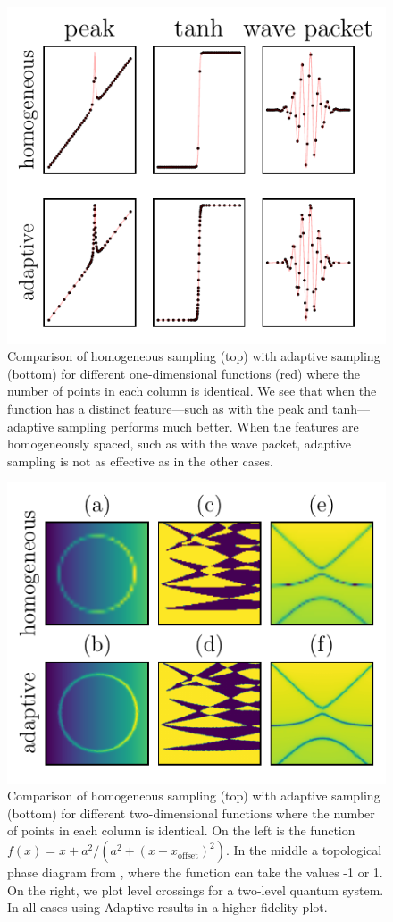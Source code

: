 \documentclass[english, twocolumn, 10pt, aps, superscriptaddress, floatfix, prb, citeautoscript]{revtex4-1}
\begin{document}
\begin{figure}
\centering
\includegraphics{figures/Learner1D.pdf}
\caption{Comparison of homogeneous sampling (top) with adaptive sampling (bottom) for different one-dimensional functions (red) where the number of points in each column is identical.
We see that when the function has a distinct feature---such as with the peak and tanh---adaptive sampling performs much better.
When the features are homogeneously spaced, such as with the wave packet, adaptive sampling is not as effective as in the other cases.\label{fig:Learner1D}}
\end{figure}

\begin{figure}
\centering
\includegraphics{figures/Learner2D.pdf}
\caption{Comparison of homogeneous sampling (top) with adaptive sampling (bottom) for different two-dimensional functions where the number of points in each column is identical.
On the left is the function \(f(x) = x + a ^ 2 / (a ^ 2 + (x - x_\textrm{offset}) ^ 2)\).
In the middle a topological phase diagram from , where the function can take the values -1 or 1.
On the right, we plot level crossings for a two-level quantum system.
In all cases using Adaptive results in a higher fidelity plot.\label{fig:Learner2D}}
\end{figure}
\end{document}
